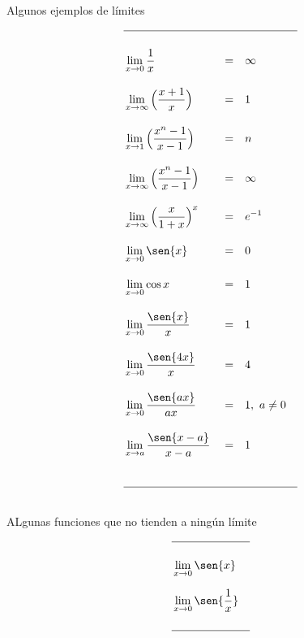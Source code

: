 \documentclass[12pt,a4paper]{extarticle}
\begin{document}
\begin{table}[!htbp]
\caption{Algunos ejemplos de l\'imites}
{\renewcommand{\arraystretch}{1.5}
\begin{align*}
\hline \\
& \lim_{x \to 0}\frac{1}{x} && =     && \infty  &\\[1em]
& \lim_{x \to \infty}\Big(\frac{x+1}{x}\Big)&&=  && 1 &\\[1em]
&\lim_{x \to 1}\Big(\frac{x^n-1}{x-1}\Big)&& =  && n &\\[1em]
&\lim_{x \to \infty}\Big(\frac{x^n-1}{x-1}\Big)&& =  && \infty &\\[1em]
&\lim_{x \to \infty}\Big(\frac{x}{1+x}\Big)^x&& =   && e^{-1} &\\[1em]
&\lim_{x \to 0} \sen{x} &&= && 0 &\\[1em]
&\lim_{x \to 0} \cos{x} &&= && 1 &\\[1em]
& \lim_{x \to 0}\frac{\sen{x}}{x} && = && 1 &\\[1em]
& \lim_{x \to 0}\frac{\sen{4x}}{x} && = && 4 &\\[1em]
& \lim_{x \to 0}\frac{\sen{ax}}{ax} && = && 1 , \ a \neq 0 \\[1em]
& \lim_{x \to a}\frac{\sen{x-a}}{x-a} && = && 1  &\\[1em]
\vspace{1cm}\\
\hline \\
\end{align*}
}
\label{tab:limReg}
\end{table}

\begin{table}[!htbp]
\caption{ALgunas funciones que no tienden a ning\'un l\'imite}
{\renewcommand{\arraystretch}{1.5}
\begin{align*}
\hline \\
&\lim_{x \to 0}\sen{x} &\\[0.7em]
&\lim_{x \to 0}\sen{\frac{1}{x}} &\\
\vspace{1cm}\\
\hline \\
\end{align*}
}
\label{tab:nolim}
\end{table}

\vspace{.5cm}
\end{document}
